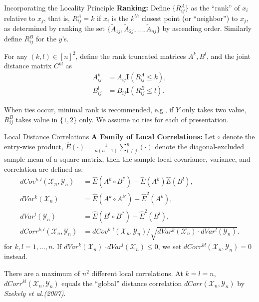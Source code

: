 \documentclass[mathserif,t]{beamer}
\providecommand{\mb}[1]{\boldsymbol{#1}}
\newcommand{\mby}{Y}
\newcommand{\E}{\hat{E}}
\begin{document}
\begin{frame}{Incorporating the Locality Principle}
\pause
\textbf{Ranking:} Define $\{R^{A}_{ij}\}$ as the ``rank'' of $x_i$ relative to $x_j$, that is, $R^{A}_{ij}=k$ if $x_i$ is the $k^{th}$ closest point (or ``neighbor'') to $x_j$, as determined by ranking the set $\{\tilde{A}_{1j},\tilde{A}_{2j},\ldots,\tilde{A}_{nj}\}$ by ascending order. Similarly define $R^{B}_{ij}$ for the $y$'s. 

\pause
\medskip
For any $(k,l) \in [n]^2$, define the rank truncated matrices $A^{k}, B^{l}$, and the joint distance matrix $C^{kl}$ as
\begin{align*}
A_{ij}^{k} &=A_{ij} \mb{I}(R^{A}_{ij} \leq k), \\
B_{ij}^{l} &=B_{ij} \mb{I}(R^{B}_{ij} \leq l). 
\end{align*}

\pause
\medskip
When ties occur, minimal rank is recommended, e.g., if $\mby$ only takes two value, $R^{B}_{ij}$ takes value in $\{1,2\}$ only. We assume no ties for each of presentation.
\end{frame}

\begin{frame}{Local Distance Correlations}
\pause
\textbf{A Family of Local Correlations:} 
Let $\circ$ denote the entry-wise product, $\E(\cdot)=\frac{1}{n(n-1)}\sum_{i \neq j}^{n} (\cdot)$ denote the diagonal-excluded sample mean of a square matrix, then the sample local covariance, variance, and correlation are defined as:
\pause
\begin{align*}
dCov^{k,l}(\mathcal{X}_{n},\mathcal{Y}_{n}) &= \E(A^{k} \circ B^{l'})- \E(A^{k})\E(B^{l}),\\
dVar^{k}(\mathcal{X}_{n}) &=\E(A^{k} \circ A^{k'})- \E^2(A^{k}), \\
dVar^{l}(\mathcal{Y}_{n}) &=\E(B^{l} \circ B^{l'})- \E^2(B^{l}), \\
dCorr^{k,l}(\mathcal{X}_{n},\mathcal{Y}_{n}) &=dCov^{k,l}(\mathcal{X}_{n},\mathcal{Y}_{n}) / \sqrt{dVar^{k}(\mathcal{X}_{n}) \cdot dVar^{l}(\mathcal{Y}_{n})}.
\end{align*}
\pause
for $k,l=1,\ldots,n$. If $dVar^{k}(\mathcal{X}_{n}) \cdot dVar^{l}(\mathcal{X}_{n}) \leq 0$, we set $dCorr^{kl}(\mathcal{X}_{n},\mathcal{Y}_{n})=0$ instead. 

\pause
\medskip
There are a maximum of $n^2$ different local correlations. At $k=l=n$, $dCorr^{kl}(\mathcal{X}_{n},\mathcal{Y}_{n})$ equals the ``global'' distance correlation $dCorr(\mathcal{X}_{n},\mathcal{Y}_{n})$ by \textit{Szekely et al.(2007)}.
\end{frame}
\end{document}

